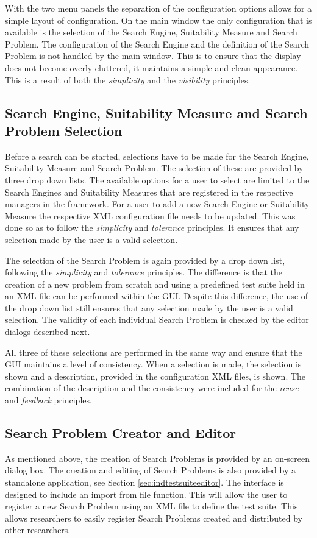 With the two menu panels the separation of the configuration options allows for a simple layout of configuration.
On the main window the only configuration that is available is the selection of the Search Engine, Suitability Measure and Search Problem.
The configuration of the Search Engine and the definition of the Search Problem is not handled by the main window.
This is to ensure that the display does not become overly cluttered, it maintains a simple and clean appearance.
This is a result of both the \emph{simplicity} and the \emph{visibility} principles.

\subsection{Search Engine, Suitability Measure and Search Problem Selection}
\label{sec:seselecdes}
\label{sec:smselecdes}
\label{sec:spselecdes}
Before a search can be started, selections have to be made for the Search Engine, Suitability Measure and Search Problem.
The selection of these are provided by three drop down lists.
The available options for a user to select are limited to the Search Engines and Suitability Measures that are registered in the respective managers in the framework.
For a user to add a new Search Engine or Suitability Measure the respective XML configuration file needs to be updated.
This was done so as to follow the \emph{simplicity} and \emph{tolerance} principles.
It ensures that any selection made by the user is a valid selection.

The selection of the Search Problem is again provided by a drop down list, following the \emph{simplicity} and \emph{tolerance} principles.
The difference is that the creation of a new problem from scratch and using a predefined test suite held in an XML file can be performed within the GUI.
Despite this difference, the use of the drop down list still ensures that any selection made by the user is a valid selection.
The validity of each individual Search Problem is checked by the editor dialogs described next.

All three of these selections are performed in the same way and ensure that the GUI maintains a level of consistency.
When a selection is made, the selection is shown and a description, provided in the configuration XML files, is shown.
The combination of the description and the consistency were included for the \emph{reuse} and \emph{feedback} principles.

\subsection{Search Problem Creator and Editor}
\label{sec:guisearchcreateed}
As mentioned above, the creation of Search Problems is provided by an on-screen dialog box.
The creation and editing of Search Problems is also provided by a standalone application, see Section \ref{sec:indtestsuiteeditor}.
The interface is designed to include an import from file function.
This will allow the user to register a new Search Problem using an XML file to define the test suite.
This allows researchers to easily register Search Problems created and distributed by other researchers.

